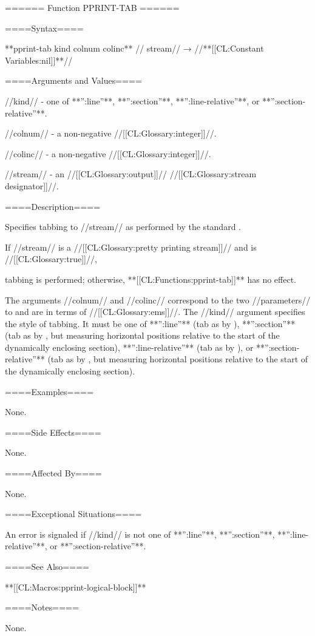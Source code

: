 ====== Function PPRINT-TAB ======

====Syntax====

**pprint-tab {kind colnum colinc** //\opt} stream// → //**[[CL:Constant Variables:nil]]**//

====Arguments and Values====

//kind// - one of **'':line''**, **'':section''**, **'':line-relative''**, or **'':section-relative''**.

//colnum// - a non-negative //[[CL:Glossary:integer]]//.

//colinc// - a non-negative //[[CL:Glossary:integer]]//.

//stream// - an //[[CL:Glossary:output]]// //[[CL:Glossary:stream designator]]//.

====Description====

Specifies tabbing to //stream// as performed by the standard .

If //stream// is a //[[CL:Glossary:pretty printing stream]]// and  is //[[CL:Glossary:true]]//,

tabbing is performed; otherwise, **[[CL:Functions:pprint-tab]]** has no effect.

The arguments //colnum// and //colinc// correspond to the two //parameters// to  and are in terms of //[[CL:Glossary:ems]]//. The //kind// argument specifies the style of tabbing. It must be one of **'':line''** (tab as by ), **'':section''** (tab as by , but measuring horizontal positions relative to the start of the dynamically enclosing section), **'':line-relative''** (tab as by ), or **'':section-relative''** (tab as by , but measuring horizontal positions relative to the start of the dynamically enclosing section).

====Examples====

None.

====Side Effects====

None.

====Affected By====

None.

====Exceptional Situations====

An error is signaled if //kind// is not one of **'':line''**, **'':section''**, **'':line-relative''**, or **'':section-relative''**.

====See Also====

**[[CL:Macros:pprint-logical-block]]**

====Notes====

None.

 
